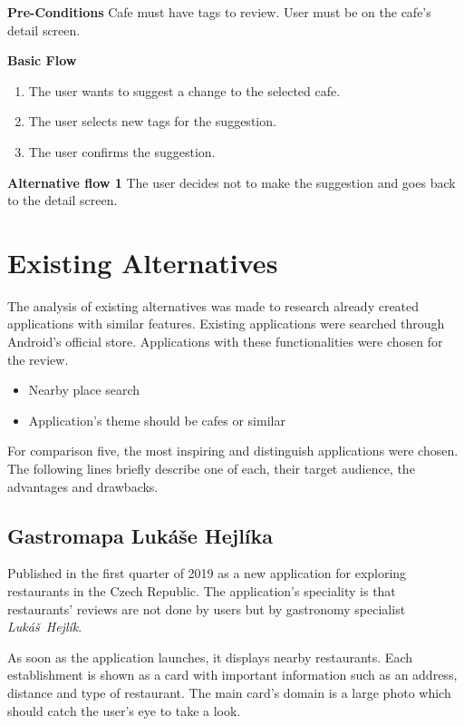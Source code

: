 \textbf{Pre-Conditions} Cafe must have tags to review.  User must be on the cafe's detail screen.

\newpara
\textbf{Basic Flow}

\begin{enumerate}
    \item The user wants to suggest a change to the selected cafe.
    \item The user selects new tags for the suggestion. 
    \item The user confirms the suggestion.
\end{enumerate}

\textbf{Alternative flow 1} The user decides not to make the suggestion and goes back to the detail screen.


\section{Existing Alternatives}
The analysis of existing alternatives was made to research already created applications with similar features. Existing applications were searched through Android's official store. Applications with these functionalities were chosen for the review.

\begin{itemize}
    \item Nearby place search
    \item Application's theme should be cafes or similar
\end{itemize}

For comparison five, the most inspiring and distinguish applications were chosen. The following lines briefly describe one of each, their target audience, the advantages and drawbacks. 

\subsection{Gastromapa Lukáše Hejlíka}
Published in the first quarter of 2019 as a new application for exploring restaurants in the Czech Republic.  The application's speciality is that restaurants' reviews are not done by users but by gastronomy specialist \textit{Lukáš~Hejlík}.

As soon as the application launches, it displays nearby restaurants. Each establishment is shown as a card with important information such as an address, distance and type of restaurant. The main card's domain is a large photo which should catch the user's eye to take a look. 

